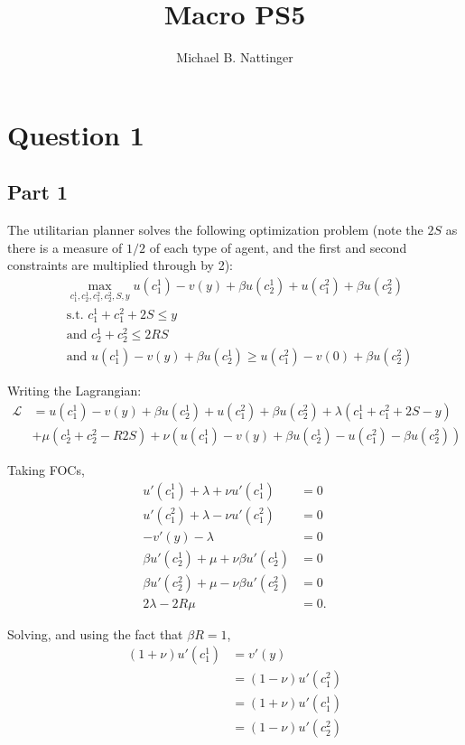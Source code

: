 \documentclass[11pt]{article} %
\title{Macro PS5}
\author{Michael B. Nattinger}
\begin{document}
\maketitle
\section{Question 1}
\subsection{Part 1}
The utilitarian planner solves the following optimization problem (note the $2S$ as there is a measure of $1/2$ of each type of agent, and the first and second constraints are multiplied through by 2):
\begin{align*}
&\max_{c_1^1,c_2^1,c_1^2,c_2^2,S,y} u(c_1^1) - v(y) + \beta u(c_2^1)+u(c_1^2) + \beta u(c_2^2)\\
&\text{s.t. } c_1^1 + c_1^2 + 2S \leq y\\
&\text{and } c_2^1 + c_2^2 \leq 2RS \\ %
&\text{and } u(c_1^1) - v(y) + \beta u(c_2^1) \geq u(c_1^2) - v(0) + \beta u(c_2^2)
\end{align*}

Writing the Lagrangian:
\begin{align*}
\mathcal{L} &= u(c_1^1) - v(y) + \beta u(c_2^1) + u(c_1^2) + \beta u(c_2^2) +\lambda (c_1^1 + c_1^2 + 2S - y)  \\ &+ \mu (c_2^1 + c_2^2 - R2S) + \nu (u(c_1^1) - v(y) + \beta u(c_2^1) - u(c_1^2) - \beta u(c_2^2))  
\end{align*}

Taking FOCs,
\begin{align*}
u'(c_1^1) + \lambda + \nu u'(c_1^1)  &= 0\\
u'(c_1^2) + \lambda - \nu u'(c_1^2) &= 0 \\
-v'(y) - \lambda &= 0\\
\beta u'(c_2^1) + \mu + \nu\beta u'(c_2^1) &= 0 \\
\beta u'(c_2^2) + \mu  - \nu\beta u'(c_2^2)&= 0 \\
2\lambda - 2R\mu &= 0.
\end{align*}

Solving, and using the fact that $\beta R = 1$,
\begin{align*}
(1+\nu)u'(c_1^1) &= v'(y)\\
&= (1-\nu)u'(c_1^2)\\
&= (1+\nu)u'(c_1^1) \\
&= (1-\nu)u'(c_2^2)
\end{align*}
\end{document}
